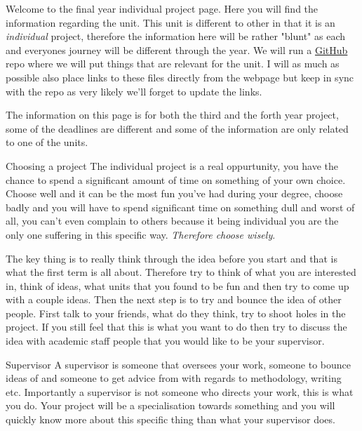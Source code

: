 \documentclass[presentation]{beamer}
\author{Carl Henrik Ek}
\date{\today}
\title{}
\begin{document}
Welcome to the final year individual project page. Here you will find the information regarding the unit. This unit is different to other in that it is an \emph{individual} project, therefore the information here will be rather "blunt" as each and everyones journey will be different through the year. We will run a \href{http://github.com/carlhenrikek/COMSM0111/}{GitHub} repo where we will put things that are relevant for the unit. I will as much as possible also place links to these files directly from the webpage but keep in sync with the repo as very likely we'll forget to update the links.

The information on this page is for \alert{both} the third and the forth year project, some of the deadlines are different and some of the information are only related to one of the units.

\begin{frame}[label={sec:orga4a365d}]{Choosing a project}
The individual project is a real oppurtunity, you have the chance to spend a significant amount of time on something of your own choice. Choose well and it can be the most fun you've had during your degree, choose badly and you will have to spend significant time on something dull and worst of all, you can't even complain to others because it being individual you are the only one suffering in this specific way. \emph{Therefore choose wisely}.

The key thing is to really think through the idea before you start and that is what the first term is all about. Therefore try to think of what you are interested in, think of ideas, what units that you found to be fun and then try to come up with a couple ideas. Then the next step is to try and bounce the idea of other people. First talk to your friends, what do they think, try to shoot holes in the project. If you still feel that this is what you want to do then try to discuss the idea with academic staff people that you would like to be your supervisor.
\end{frame}

\begin{frame}[label={sec:org7f71b8f}]{Supervisor}
A supervisor is someone that oversees your work, someone to bounce ideas of and someone to get advice from with regards to methodology, writing etc. Importantly a supervisor is \alert{not} someone who directs your work, this is what you do. Your project will be a specialisation towards something and you will quickly know more about this specific thing than what your supervisor does.
\end{frame}
\end{document}
